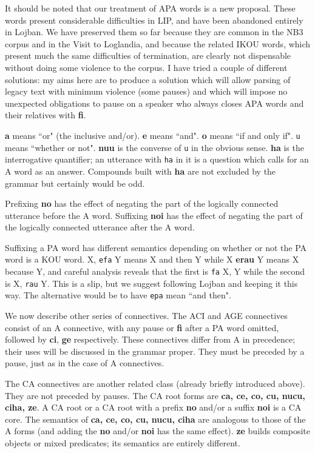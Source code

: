\documentclass[12pt]{book}
\begin{document}
{It should be noted that our treatment of APA words is a new proposal.   These words present considerable difficulties in LIP, and have been abandoned entirely in Lojban.   We have preserved them so far because they are common in the NB3 corpus and in the Visit to Loglandia, and because the related IKOU words, which present much the same difficulties of termination, are clearly not dispensable without doing some violence to the corpus.   I have tried a couple of different solutions:  my aims here are to produce a solution which will allow parsing of legacy text with minimum violence (some pauses) and which will impose no unexpected obligations to pause on a speaker who always closes APA words and their relatives with {\bf fi}.

{\bf a} means ``or" (the inclusive and/or).   {\bf e} means ``and".  {\bf o} means ``if and only if".  {\tt u} means ``whether or not".   {\bf nuu} is the converse of {\tt u} in the obvious sense.   {\bf ha} is the interrogative quantifier; an utterance with {\tt ha} in it is a question which calls for an A word as an answer.   Compounds built with {\bf ha} are not excluded by the grammar but certainly would be odd.

Prefixing {\bf no} has the effect of negating the part of the logically connected utterance before the A word.
Suffixing {\bf noi} has the effect of negating the part of the logically connected utterance after the A word.

Suffixing a PA word has different semantics depending on whether or not the PA word is a KOU word.  X, {\tt efa} Y means X and then Y  while X {\bf erau} Y means X because Y,
and careful analysis reveals that the first is {\tt fa} X, Y while the second is X, {\tt rau} Y.   This is a slip, but we suggest following Lojban and keeping it this way.   The alternative
would be to have {\tt epa} mean ``and then".

We now describe other series of connectives.   The ACI and AGE connectives consist of an A connective, with any pause or {\bf fi} after a PA word omitted, followed
by {\bf ci}, {\bf ge} respectively.   These connectives differ from A in precedence; their uses will be discussed in the grammar proper.   They must be preceded by a pause, just as in the case of A connectives.

The CA connectives are another related class (already briefly introduced above).   They are not preceded by pauses.   The CA root forms are {\bf ca, ce, co, cu, nucu, ciha, ze}.  A CA root or a CA root with a prefix {\bf no} and/or a suffix {\bf noi} is a CA core.    The semantics of {\bf ca, ce, co, cu, nucu, ciha} are analogous to those of the A forms (and adding the {\bf no} and/or {\bf noi} has the same effect).  
{\bf ze} builds composite objects or mixed predicates; its semantics are entirely different.

}
\end{document}
